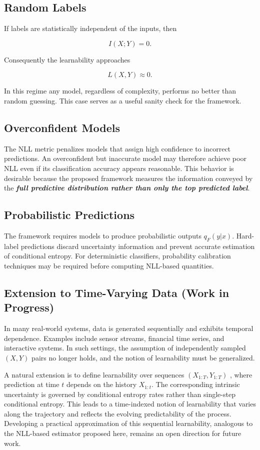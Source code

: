 \documentclass{article}
\begin{document}
\subsection{Random Labels}

If labels are statistically independent of the inputs, then

\[
I(X;Y)=0.
\]

Consequently the learnability approaches

\[
L(X,Y)\approx 0.
\]

In this regime any model, regardless of complexity, performs no better 
than random guessing. This case serves as a useful sanity check for the 
framework.

\subsection{Overconfident Models}

The NLL metric penalizes models that assign high confidence to incorrect 
predictions. An overconfident but inaccurate model may therefore achieve 
poor NLL even if its classification accuracy appears reasonable. 
This behavior is desirable because the proposed framework measures the 
information conveyed by the \textbf{ \textit{full predictive distribution rather than 
only the top predicted label}}.

\subsection{Probabilistic Predictions}

The framework requires models to produce probabilistic outputs 
$q_F(y|x)$. Hard-label predictions discard uncertainty information and 
prevent accurate estimation of conditional entropy. For deterministic 
classifiers, probability calibration techniques may be required before 
computing NLL-based quantities.

\subsection{Extension to Time-Varying Data (Work in Progress)}
In many real-world systems, data is generated sequentially and exhibits temporal dependence. 
Examples include sensor streams, financial time series, and interactive systems. 
In such settings, the assumption of independently sampled $(X,Y)$ pairs no longer holds, and the notion of learnability must be generalized.

A natural extension is to define learnability over sequences $(X_{1:T}, Y_{1:T})$
, where prediction at time $t$ depends on the history $X_{1:t}$. 
The corresponding intrinsic uncertainty is governed by conditional 
entropy rates rather than single-step conditional entropy. 
This leads to a time-indexed notion of learnability that varies along the trajectory and reflects the evolving predictability of the process.
Developing a practical approximation of this sequential learnability, analogous to the NLL-based estimator proposed here, remains an open direction for future work.
\end{document}
